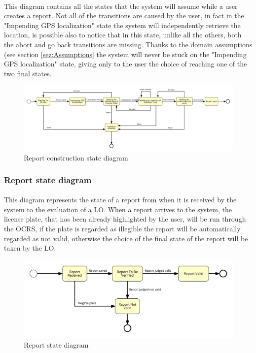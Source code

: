 					\paragraph{}
						This diagram contains all the states that the system will assume while a user creates a report.
						Not all of the
transitions are caused by the user, in fact in the "Impending GPS localization" state the system will independently retrieve the location, is possible also to notice that in this state, unlike all the others, both the abort and go back transitions are missing.
						Thanks to the domain assumptions (see section \ref{sez:Assumptions} the system will never be stuck on the "Impending GPS localization" state, giving only to the user the choice of reaching one of the two final states.
						\begin{figure}[htbp]
  							\includegraphics[width=\textwidth]{images/StateDiagram/ReportCreationToolStateDiagram.pdf}
  							\centering
  							\caption{Report construction state diagram}
						\end{figure}
				\subsubsection{Report state diagram}
					\paragraph{}
						This diagram represents the state of a report from when it is received by the system to the evaluation of a LO. When a report arrives to the system, the license plate, that has been already highlighted by the user, will be run through the OCRS, if the plate is regarded as illegible the report will be automatically regarded as not valid, otherwise the choice of the final state of the report will be taken by the LO.
					\begin{figure}[htbp]
  							\includegraphics[width=\textwidth]{images/StateDiagram/ReportStateDiagram.pdf}
  							\centering
  							\caption{Report state diagram}
						\end{figure}
